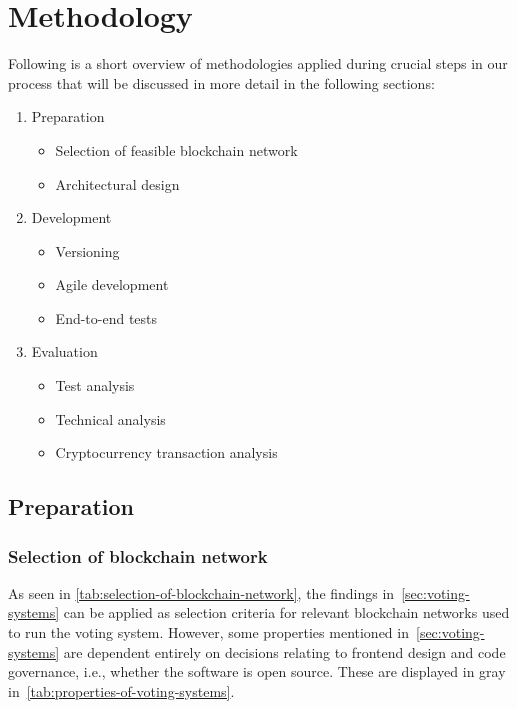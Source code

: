 \chapter{Methodology}\label{ch:methodology}

Following is a short overview of methodologies applied during crucial steps in our process that will be discussed in more detail in the following sections:

\begin{enumerate}
    \item Preparation
    \begin{itemize}
        \item Selection of feasible blockchain network
        \item Architectural design
    \end{itemize}
    \item Development
    \begin{itemize}
        \item Versioning
        \item Agile development
        \item End-to-end tests
    \end{itemize}
    \item Evaluation
    \begin{itemize}
        \item Test analysis
        \item Technical analysis
        \item Cryptocurrency transaction analysis
    \end{itemize}
\end{enumerate}

\section{Preparation}\label{sec:preparation}

\subsection{Selection of blockchain network}\label{subsec:selection-of-blockchain-network}

As seen in \cref{tab:selection-of-blockchain-network}, the findings in~\cref{sec:voting-systems} can be applied as selection criteria for relevant blockchain networks used to run the voting system.
However, some properties mentioned in~\cref{sec:voting-systems} are dependent entirely on decisions relating to frontend design and code governance, i.e., whether the software is open source.
These are displayed in gray in~\cref{tab:properties-of-voting-systems}.


